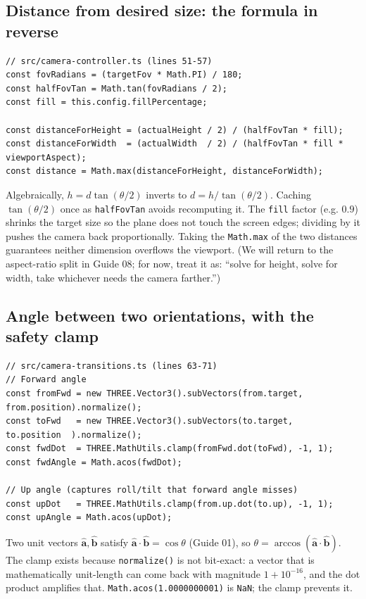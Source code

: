 \documentclass{article}
\begin{document}
\subsection{Distance from desired size: the formula in reverse}

\begin{lstlisting}
// src/camera-controller.ts (lines 51-57)
const fovRadians = (targetFov * Math.PI) / 180;
const halfFovTan = Math.tan(fovRadians / 2);
const fill = this.config.fillPercentage;

const distanceForHeight = (actualHeight / 2) / (halfFovTan * fill);
const distanceForWidth  = (actualWidth  / 2) / (halfFovTan * fill * viewportAspect);
const distance = Math.max(distanceForHeight, distanceForWidth);
\end{lstlisting}

Algebraically, $h = d \tan(\theta/2)$ inverts to $d = h / \tan(\theta/2)$.
Caching $\tan(\theta/2)$ once as \lstinline{halfFovTan} avoids recomputing it.
The \lstinline{fill} factor (e.g. $0.9$) shrinks the target size so the plane
does not touch the screen edges; dividing by it pushes the camera back
proportionally. Taking the \lstinline{Math.max} of the two distances
guarantees neither dimension overflows the viewport. (We will return to the
aspect-ratio split in Guide 08; for now, treat it as: ``solve for height,
solve for width, take whichever needs the camera farther.'')

\subsection{Angle between two orientations, with the safety clamp}

\begin{lstlisting}
// src/camera-transitions.ts (lines 63-71)
// Forward angle
const fromFwd = new THREE.Vector3().subVectors(from.target, from.position).normalize();
const toFwd   = new THREE.Vector3().subVectors(to.target,   to.position  ).normalize();
const fwdDot  = THREE.MathUtils.clamp(fromFwd.dot(toFwd), -1, 1);
const fwdAngle = Math.acos(fwdDot);

// Up angle (captures roll/tilt that forward angle misses)
const upDot   = THREE.MathUtils.clamp(from.up.dot(to.up), -1, 1);
const upAngle = Math.acos(upDot);
\end{lstlisting}

Two unit vectors $\hat{\mathbf{a}}, \hat{\mathbf{b}}$ satisfy
$\hat{\mathbf{a}} \cdot \hat{\mathbf{b}} = \cos\theta$ (Guide 01), so
$\theta = \arccos(\hat{\mathbf{a}} \cdot \hat{\mathbf{b}})$. The clamp exists
because \lstinline{normalize()} is not bit-exact: a vector that is mathematically
unit-length can come back with magnitude $1 + 10^{-16}$, and the dot product
amplifies that. \lstinline{Math.acos(1.0000000001)} is \lstinline{NaN}; the
clamp prevents it.
\end{document}
